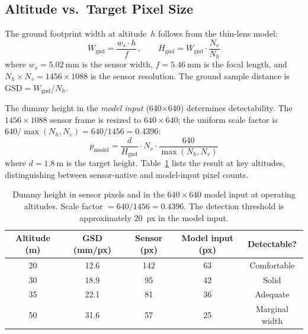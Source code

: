 \subsection{Altitude vs.\ Target Pixel Size}\label{sec:vp:altitude}

The ground footprint width at altitude~$h$ follows from the thin-lens model:
\begin{equation}\label{eq:footprint-vp}
  W_{\mathrm{gnd}} = \frac{w_s \cdot h}{f}\,,
  \qquad
  H_{\mathrm{gnd}} = W_{\mathrm{gnd}} \cdot \frac{N_v}{N_h}
\end{equation}
where $w_s = \SI{5.02}{\milli\metre}$ is the sensor width,
$f = \SI{5.46}{\milli\metre}$ is the focal length, and $N_h \times N_v = 1456
\times 1088$ is the sensor resolution.  The ground sample distance is
$\mathrm{GSD} = W_{\mathrm{gnd}} / N_h$.

The dummy height in the \emph{model input} (640$\times$640) determines
detectability.  The $1456 \times 1088$ sensor frame is resized to $640 \times 640$;
the uniform scale factor is $640 / \max(N_h, N_v) = 640/1456 = 0.4396$:
\begin{equation}\label{eq:dummypx}
  p_{\mathrm{model}} = \frac{d}{H_{\mathrm{gnd}}} \cdot N_v
    \cdot \frac{640}{\max(N_h, N_v)}
\end{equation}
where $d = \SI{1.8}{\metre}$ is the target height.  Table~\ref{tab:px-by-alt}
lists the result at key altitudes, distinguishing between sensor-native and
model-input pixel counts.

\begin{table}[ht]
  \centering
  \caption{Dummy height in sensor pixels and in the $640\!\times\!640$ model input
  at operating altitudes.  Scale factor $= 640/1456 = 0.4396$.  The detection
  threshold is approximately \SI{20}{px} in the model input.}\label{tab:px-by-alt}
  \begin{tabular}{@{}c c c c c@{}}
    \toprule
    \textbf{Altitude (m)} & \textbf{GSD (mm/px)} & \textbf{Sensor (px)} &
      \textbf{Model input (px)} & \textbf{Detectable?} \\
    \midrule
    20 & 12.6 & 142 & 63 & Comfortable \\
    30 & 18.9 &  95 & 42 & Solid \\
    35 & 22.1 &  81 & 36 & Adequate \\
    50 & 31.6 &  57 & 25 & Marginal width \\
    \bottomrule
  \end{tabular}
\end{table}


